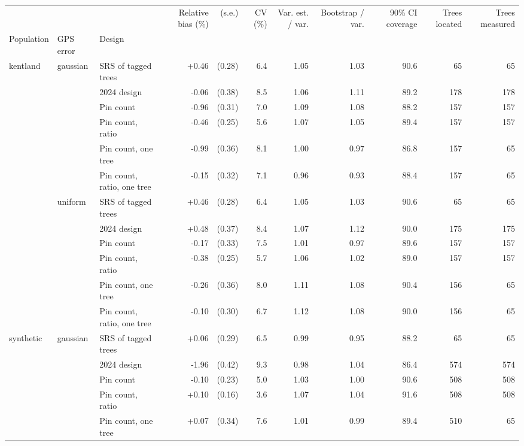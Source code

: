 \begin{tabular}{lll|rr|r|rr|r|rr}
\toprule
 &  &  & Relative bias (\%) & (s.e.) & CV (\%) & Var. est. / var. & Bootstrap / var. & 90\% CI coverage & Trees located & Trees measured \\
Population & GPS error & Design &  &  &  &  &  &  &  &  \\
\midrule
\multirow[t]{12}{*}{kentland} & \multirow[t]{6}{*}{gaussian} & SRS of tagged trees & +0.46 & (0.28) & 6.4 & 1.05 & 1.03 & 90.6 & 65 & 65 \\
 &  & 2024 design & -0.06 & (0.38) & 8.5 & 1.06 & 1.11 & 89.2 & 178 & 178 \\
 &  & Pin count & -0.96 & (0.31) & 7.0 & 1.09 & 1.08 & 88.2 & 157 & 157 \\
 &  & Pin count, ratio & -0.46 & (0.25) & 5.6 & 1.07 & 1.05 & 89.4 & 157 & 157 \\
 &  & Pin count, one tree & -0.99 & (0.36) & 8.1 & 1.00 & 0.97 & 86.8 & 157 & 65 \\
 &  & Pin count, ratio, one tree & -0.15 & (0.32) & 7.1 & 0.96 & 0.93 & 88.4 & 157 & 65 \\
\cline{2-11}
 & \multirow[t]{6}{*}{uniform} & SRS of tagged trees & +0.46 & (0.28) & 6.4 & 1.05 & 1.03 & 90.6 & 65 & 65 \\
 &  & 2024 design & +0.48 & (0.37) & 8.4 & 1.07 & 1.12 & 90.0 & 175 & 175 \\
 &  & Pin count & -0.17 & (0.33) & 7.5 & 1.01 & 0.97 & 89.6 & 157 & 157 \\
 &  & Pin count, ratio & -0.38 & (0.25) & 5.7 & 1.06 & 1.02 & 89.0 & 157 & 157 \\
 &  & Pin count, one tree & -0.26 & (0.36) & 8.0 & 1.11 & 1.08 & 90.4 & 156 & 65 \\
 &  & Pin count, ratio, one tree & -0.10 & (0.30) & 6.7 & 1.12 & 1.08 & 90.0 & 156 & 65 \\
\cline{1-11} \cline{2-11}
\multirow[t]{12}{*}{synthetic} & \multirow[t]{6}{*}{gaussian} & SRS of tagged trees & +0.06 & (0.29) & 6.5 & 0.99 & 0.95 & 88.2 & 65 & 65 \\
 &  & 2024 design & -1.96 & (0.42) & 9.3 & 0.98 & 1.04 & 86.4 & 574 & 574 \\
 &  & Pin count & -0.10 & (0.23) & 5.0 & 1.03 & 1.00 & 90.6 & 508 & 508 \\
 &  & Pin count, ratio & +0.10 & (0.16) & 3.6 & 1.07 & 1.04 & 91.6 & 508 & 508 \\
 &  & Pin count, one tree & +0.07 & (0.34) & 7.6 & 1.01 & 0.99 & 89.4 & 510 & 65 \\

\end{tabular}
